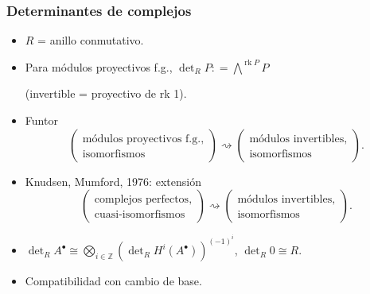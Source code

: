 \documentclass[handout]{beamer}
\newcommand{\ZZ}{\mathbb{Z}}
\newcommand{\dfn}{\mathrel{\mathop:}=}
\DeclareMathOperator{\rk}{rk}
\begin{document}

\begin{frame}
  \frametitle{Determinantes de complejos}

  \begin{itemize}
  \item $R$ = anillo conmutativo.

  \item Para módulos proyectivos f.g.,
    $\det\nolimits_R P \dfn \bigwedge^{\rk P} P$

    (invertible = proyectivo de rk 1).

  \item Funtor
    \[ \left(\!\!\begin{array}{c}
              \text{módulos proyectivos f.g.}, \\
              \text{isomorfismos}
       \end{array}\!\!\right) \rightsquigarrow
       \left(\!\!\begin{array}{c}
               \text{módulos invertibles}, \\
               \text{isomorfismos}
       \end{array}\!\!\right). \]

  \item Knudsen, Mumford, 1976: extensión
    \[ \left(\!\!\begin{array}{c}
              \text{complejos perfectos}, \\
              \text{cuasi-isomorfismos}
       \end{array}\!\!\right) \rightsquigarrow
       \left(\!\!\begin{array}{c}
                \text{módulos invertibles}, \\
                \text{isomorfismos}
       \end{array}\!\!\right). \]

 \item $\det\nolimits_R A^\bullet \cong \bigotimes_{i\in \ZZ} (\det_R H^i (A^\bullet))^{(-1)^i}$,
   $\det\nolimits_R 0 \cong R$.

  \item Compatibilidad con cambio de base.
  \end{itemize}
\end{frame}

\end{document}
